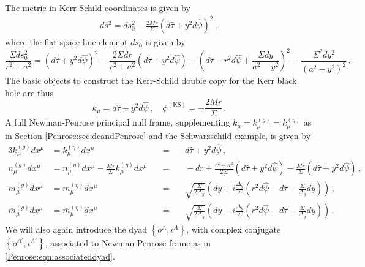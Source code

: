 The metric in Kerr-Schild coordinates is given by
\begin{equation}\label{Penrose:eqn:KKSmetric}
\begin{aligned}
ds^2 =  ds^2_{0} - \frac{2 M r}{\Sigma} \left(d\hat{\tau} + y^2 d\hat{\psi} \right)^2 \, ,
\end{aligned}
\end{equation}
where the flat space line element $ds_{0}$ is given by
\begin{equation}
\frac{\Sigma ds^2_{0}}{r^2+a^2}	= \left(d\hat{\tau} + y^2 d\hat{\psi} \right)^2 - \frac{2 \Sigma dr}{r^2+a^2}  \left(d\hat{\tau} + y^2 d\hat{\psi} \right) - \left(d\hat{\tau}-r^2 d\hat{\psi} + \frac{\Sigma dy}{a^2-y^2}  \right)^2 -  \frac{\Sigma^2 dy^2}{\left(a^2-y^2\right)^2} \, .
\end{equation}
The basic objects to construct the Kerr-Schild double copy for the Kerr black hole are thus
\begin{equation}
k_{\mu} = d\hat{\tau} + y^2 d\hat{\psi} \, , \quad \phi^{(\mathrm{KS})} =  - \frac{2 M r}{\Sigma}  \, .
\end{equation}
A full Newman-Penrose principal null frame, supplementing $k_{\mu} = k^{(g)}_{\mu} = k^{(\eta)}_{\mu}$ as in Section \ref{Penrose:sec:dcandPenrose} and the Schwarzschild example,  is given by
\begin{alignat}{3}
k^{(g)}_{\mu}dx^{\mu} &= k^{(\eta)}_{\mu}dx^{\mu} &=& \quad  d\hat{\tau} + y^2 d\hat{\psi}\, , \nonumber \\
n^{(g)}_{\mu}dx^{\mu} &= n^{(\eta)}_{\mu}dx^{\mu} -\frac{M r}{\Sigma} k^{(\eta)}_{\mu}dx^{\mu} \quad  &=& \quad  -dr+\frac{r^2+a^2}{2 \Sigma}\left(d\hat{\tau} + y^2 d\hat{\psi}\right)  - \frac{M r}{\Sigma} \left(d\hat{\tau} + y^2 d\hat{\psi}\right) \, , \nonumber \\
m^{(g)}_{\mu}dx^{\mu} &= m^{(\eta)}_{\mu}dx^{\mu} &=& \quad  \sqrt{\frac{\Sigma}{2\Delta_y}}\left(dy+i \frac{\Delta_y}{\Sigma} \left(r^2 d\hat{\psi}-d\hat{\tau}-\frac{\Sigma}{\Delta_y}dy\right)\right)\, ,  \nonumber \\
\bar{m}^{(g)}_{\mu}dx^{\mu} &=  \bar{m}^{(\eta)}_{\mu}dx^{\mu} &=&  \quad  \sqrt{\frac{\Sigma}{2\Delta_y}}\left(dy-i \frac{\Delta_y}{\Sigma} \left(r^2 d\hat{\psi}-d\hat{\tau}-\frac{\Sigma}{\Delta_y}dy\right)\right) \, . \label{Penrose:eqn:Kerrframe}
\end{alignat}
We will also again introduce the dyad $\left\lbrace o^A, \iota^A \right\rbrace$, with complex conjugate $\left\lbrace \bar{o}^{A'}, \bar{\iota}^{A'} \right\rbrace$, associated to Newman-Penrose frame as in \eqref{Penrose:eqn:associateddyad}.

